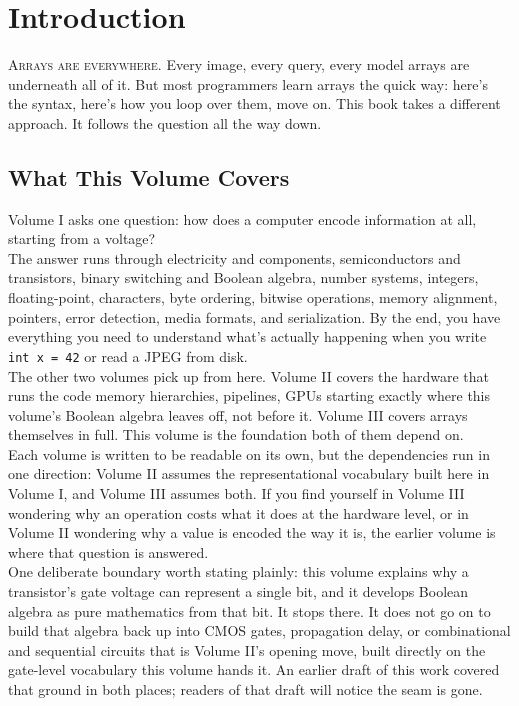 \chapter*{Introduction}

\lettrine{A}{rrays are everywhere}. Every image, every query, every model arrays are underneath all of it. But most programmers learn arrays the quick way: here's the syntax, here's how you loop over them, move on. This book takes a different approach. It follows the question all the way down.

\section*{What This Volume Covers}

Volume I asks one question: how does a computer encode information at all, starting from a voltage?\\
The answer runs through electricity and components, semiconductors and transistors, binary switching and Boolean algebra, number systems, integers, floating-point, characters, byte ordering, bitwise operations, memory alignment, pointers, error detection, media formats, and serialization. By the end, you have everything you need to understand what's actually happening when you write \texttt{int x = 42} or read a JPEG from disk.\\
The other two volumes pick up from here. Volume II covers the hardware that runs the code memory hierarchies, pipelines, GPUs starting exactly where this volume's Boolean algebra leaves off, not before it. Volume III covers arrays themselves in full. This volume is the foundation both of them depend on.\\
Each volume is written to be readable on its own, but the dependencies run in one direction: Volume II assumes the representational vocabulary built here in Volume I, and Volume III assumes both. If you find yourself in Volume III wondering why an operation costs what it does at the hardware level, or in Volume II wondering why a value is encoded the way it is, the earlier volume is where that question is answered.\\
One deliberate boundary worth stating plainly: this volume explains why a transistor's gate voltage can represent a single bit, and it develops Boolean algebra as pure mathematics from that bit. It stops there. It does not go on to build that algebra back up into CMOS gates, propagation delay, or combinational and sequential circuits that is Volume II's opening move, built directly on the gate-level vocabulary this volume hands it. An earlier draft of this work covered that ground in both places; readers of that draft will notice the seam is gone.
\newpage
